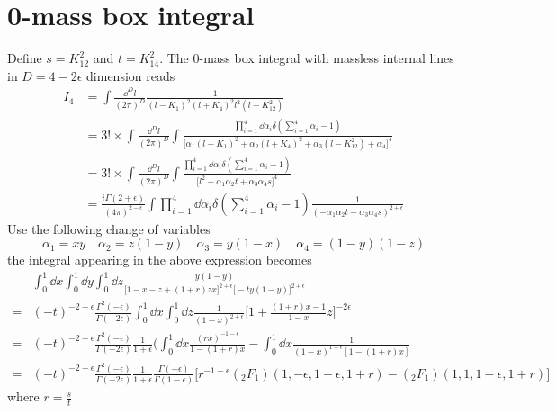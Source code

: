 \section{0-mass box integral}
Define $s=K_{12}^2$ and $t=K_{14}^2$.
The 0-mass box integral with massless internal lines in $D=4-2\epsilon$ dimension reads
\begin{equation*}
\begin{split}
I_4 & = \int\frac{\dd^D l }{(2\pi)^D}\frac{1}{(l-K_1)^2(l+K_4)^2 l^2 (l-K_{12}^2)}
\\
&=
3!\times\int\frac{\dd^D l }{(2\pi)^D}
\int
\frac{\prod_{i=1}^4\dd\alpha_i \delta(\sum_{i=1}^4\alpha_i -1)}{\big[\alpha_1(l-K_1)^2 + \alpha_2(l+K_4)^2 + \alpha_3 (l-K_{12}^2) + \alpha_4\big]^4}
\\
&=
3!\times\int\frac{\dd^D l }{(2\pi)^D}
\int
\frac{\prod_{i=1}^4\dd\alpha_i \delta(\sum_{i=1}^4\alpha_i -1)}{\big[l^2 + \alpha_1\alpha_2 t + \alpha_3\alpha_4 s\big]^4}
\\
&= \frac{i\Gamma(2+\epsilon)}{(4\pi)^{2-\epsilon}}\int\prod_{i=1}^4\dd\alpha_i \delta(\sum_{i=1}^4\alpha_i -1)\frac{1}{(-\alpha_1\alpha_2 t - \alpha_3\alpha_4 s )^{2+\epsilon}}
\end{split}
\end{equation*}
%
Use the following change of variables
\begin{equation*}
\alpha_1 = xy \quad
\alpha_2 = z(1-y)\quad
\alpha_3 = y(1-x)\quad
\alpha_4 = (1-y)(1-z)
\end{equation*}
%
the integral appearing in the above expression becomes
\begin{equation*}
\begin{split}
& \int^1_0\dd x\int^1_0\dd y\int^1_0\dd z \frac{y(1-y)}{\big[1-x-z + (1+r)zx\big]^{2+\epsilon}\big[-ty(1-y)\big]^{2+\epsilon}}
\\ = &
(-t)^{-2-\epsilon}\frac{\Gamma^2(-\epsilon)}{\Gamma(-2\epsilon)}
\int_0^1\dd x\int_0^1\dd z
\frac{1}{(1-x)^{2+\epsilon}}\Big[1+\frac{(1+r)x-1}{1-x} z\Big]^{-2\epsilon}
\\
= &(-t)^{-2-\epsilon}\frac{\Gamma^2(-\epsilon)}{\Gamma(-2\epsilon)}
\frac{1}{1+\epsilon} 
\Big(\int_0^1 \dd x \frac{(rx)^{-1-\epsilon}}{1-(1+r)x} -
\int^1_0 \dd x \frac{1}{(1-x)^{1+\epsilon}[1-(1+r)x]}
\\
= & 
 (-t)^{-2-\epsilon}\frac{\Gamma^2(-\epsilon)}{\Gamma(-2\epsilon)}
\frac{1}{1+\epsilon}\frac{\Gamma(-\epsilon)}{\Gamma(1-\epsilon)} 
\big[r^{-1-\epsilon}(_2F_1)(1,-\epsilon,1-\epsilon,1+r) -(_2F_1)(1, 1 ,1-\epsilon,1+r)\big]
\end{split}
\end{equation*}
where $r = \frac{s}{t}$


